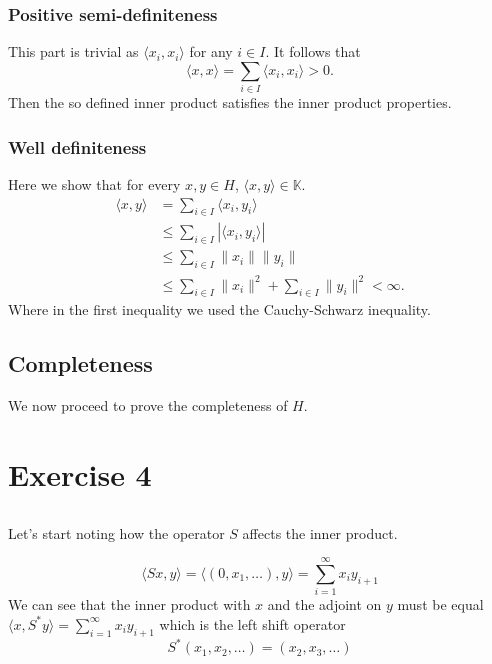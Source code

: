 \documentclass[a4paper,12pt]{article} %
\begin{document}
\subsubsection{Positive semi-definiteness}
This part is trivial as \(\langle x_i,x_i \rangle \) for any \(i \in I\). It follows that
\begin{equation}
    \langle x,x \rangle = \sum_{i \in  I}\langle x_i,x_i \rangle  > 0.
\end{equation}
Then the so defined inner product satisfies the inner product properties.

\subsubsection{Well definiteness}
Here we show that for every \(x,y \in  H\), \(\langle x,y \rangle \in  \mathbb{K}\).
\begin{align*}
    \langle x,y \rangle & = \sum_{i \in  I}\langle x_i, y_i \rangle       \\
                        & \leq  \sum_{i \in  I}|\langle x_i,y_i \rangle | \\
                        & \leq \sum_{i \in I}\| x_i \|\| y_i \|           \\ &\leq \sum_{i \in  I} \| x_i \|^{2} + \sum_{i \in  I}\| y_i \|^{2} < \infty.
\end{align*}
Where in the first inequality we used the Cauchy-Schwarz inequality.
\subsection{Completeness}
We now proceed to prove the completeness of \(H\).



\section{Exercise 4}
\subsection{}

Let's start noting how the operator \(S\) affects the inner product.

\[
    \langle Sx,y \rangle = \langle (0,x_1  , \dots ),y \rangle = \sum_{i=1}^{\infty} x_i y_{i+1}
\]
We can see that the inner product with \(x\) and the adjoint on \(y\) must be equal  \(\langle x,S^*y \rangle=\sum_{i=1}^{\infty} x_i y_{i+1} \)
which is the left shift operator
\[
    S^*(x_1,x_2,\dots ) = (x_2,x_3, \dots  )
\]
\end{document}

